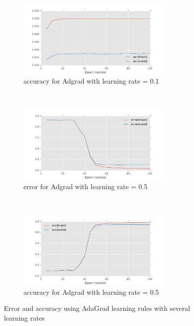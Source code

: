 \documentclass[11pt]{article}
\begin{document}
\begin{figure}[t!]
\begin{subfigure}[t]{0.45\textwidth}
    \end{subfigure}   
    ~
    \begin{subfigure}[t]{0.45\textwidth}
        \centering
        \includegraphics[height=1.5in]{acc_with_Adgrad_0_1.pdf}
        \caption{accuracy for Adgrad with learning rate = 0.1}
    \end{subfigure}    
	~
    \begin{subfigure}[t]{0.45\textwidth}
        \centering
        \includegraphics[height=1.5in]{error_with_Adgrad_0_5.pdf}
        \caption{error for Adgrad with learning rate = 0.5}
    \end{subfigure}   
    ~
    \begin{subfigure}[t]{0.45\textwidth}
        \centering
        \includegraphics[height=1.5in]{acc_with_Adgrad_0_5.pdf}
        \caption{accuracy for Adgrad with learning rate = 0.5}
    \end{subfigure}       
    \caption{Error and accuracy using AdaGrad learning rules with several learning rates}    
    \label{fig:Adagrad}
\end{figure}
\end{document}
